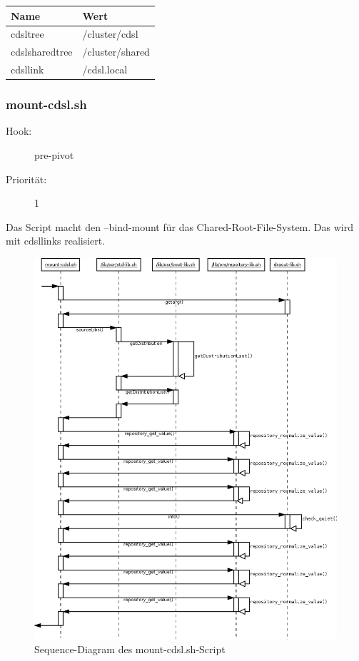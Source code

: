 \documentclass[10pt,a4paper]{article}
\begin{document}
\medskip 

\begin{tabular}{|l|l|}
 \hline
\textbf{Name} & \textbf{ Wert} \\ \hline
cdsltree & /cluster/cdsl \\ \hline
cdslsharedtree & /cluster/shared \\ \hline
cdsllink & /cdsl.local \\ \hline
\end{tabular} 

\subsubsection{mount-cdsl.sh}
\begin{description}
\item[Hook:] pre-pivot
\item[Priorität:] 1
\end{description}

Das Script macht den --bind-mount für das Chared-Root-File-System. Das wird mit cdsllinks realisiert.

\begin{figure}[H]
 \centering
 \includegraphics[scale=0.35]{./sequence_diagram_mount-cdsl_DE_de.png}
 \caption[]{Sequence-Diagram des mount-cdsl.sh-Script}
\end{figure}
\end{document}
